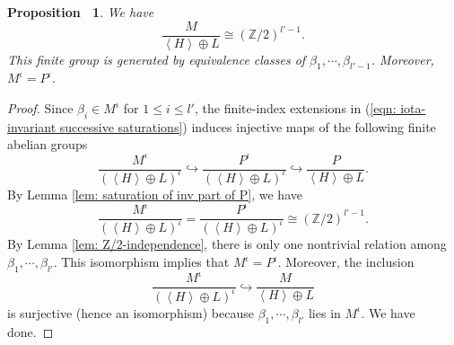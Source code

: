 \documentclass[12pt,reqno,a4paper]{amsart}
\newtheorem{prop}[thm]{Proposition~}
\theoremstyle{remark}
\theoremstyle{definition}
\newcommand{\ZZ}{\mathbb{Z}}
\newcommand{\calV}{\mathcal{V}}
\newcommand{\bd}{\textbf{d}}
\newcommand{\red}{\textcolor{red}}
\begin{document}
\begin{prop}
\label{prop: saturation of M_F}  
We have 
    \begin{equation*}
        \frac{M}{\left\langle H\right\rangle \oplus L}\cong (\ZZ/2)^{l'-1}.
    \end{equation*}
    This finite group is generated by equivalence classes of $\beta_1,\cdots, \beta_{l'-1}$.
    Moreover, $M^{\iota} = P^{\iota}$.
\end{prop}
\begin{proof}
Since $\beta_i \in M^{\iota}$ for $1\le i\le l'$, the finite-index extensions in (\ref{eqn: iota-invariant successive saturations}) induces injective maps of the following finite abelian groups
\begin{equation*}
    \frac{M^{\iota}}{(\left\langle H \right\rangle\oplus L)^{\iota}} \hookrightarrow \frac{P^{\iota}}{(\left\langle H \right\rangle\oplus L)^{\iota}} \hookrightarrow \frac{P}{\left\langle H \right\rangle\oplus L}.
\end{equation*}
By Lemma \ref{lem: saturation of inv part of P}, we have 
\begin{equation*}
    \frac{M^{\iota}}{(\left\langle H \right\rangle\oplus L)^{\iota}} = \frac{P^{\iota}}{(\left\langle H \right\rangle\oplus L)^{\iota}} \cong (\ZZ/2)^{l'-1}.
\end{equation*}
By Lemma \ref{lem: Z/2-independence}, there is only one nontrivial relation among $\beta_1, \cdots, \beta_{l'}$. 
This isomorphism implies that $M^{\iota} = P^{\iota}$.
Moreover, the inclusion 
\begin{equation*}
    \frac{M^{\iota}}{(\left\langle H \right\rangle\oplus L)^{\iota}} \hookrightarrow \frac{M}{\left\langle H \right\rangle\oplus L}
\end{equation*}
is surjective (hence an isomorphism) because $\beta_1, \cdots, \beta_{l'}$ lies in $M^\iota$. We have done.
\end{proof}
\end{document}
